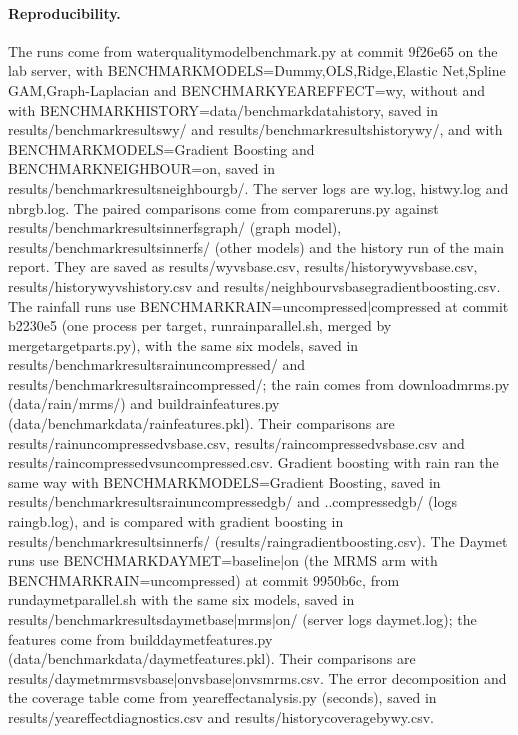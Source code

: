 \documentclass[11pt]{article}
\newcommand{\codeus}{\textunderscore\allowbreak}
\newcommand{\code}[1]{{\ttfamily\let\_\codeus #1}}
\begin{document}
\paragraph{Reproducibility.} The runs come from \code{water\_quality\_model\_benchmark.py} at commit
\code{9f26e65} on the lab server, with
\code{BENCHMARK\_MODELS=Dummy,OLS,Ridge,Elastic Net,Spline GAM,Graph-Laplacian} and
\code{BENCHMARK\_YEAR\_EFFECT=wy}, without and with \code{BENCHMARK\_HISTORY=data/benchmark\_data\_history},
saved in \code{results/benchmark\_results\_wy/} and \code{results/benchmark\_results\_history\_wy/}, and
with \code{BENCHMARK\_MODELS=Gradient Boosting} and \code{BENCHMARK\_NEIGHBOUR=on}, saved in
\code{results/benchmark\_results\_neighbour\_gb/}. The server logs are \code{wy.log},
\code{hist\_wy.log} and \code{nbr\_gb.log}. The paired comparisons come from \code{compare\_runs.py} against
\code{results/benchmark\_results\_inner\_fs\_graph/} (graph model),
\code{results/benchmark\_results\_inner\_fs/} (other models) and the history run of the main report.
They are saved as \code{results/wy\_vs\_base\_*.csv}, \code{results/history\_wy\_vs\_base\_*.csv},
\code{results/history\_wy\_vs\_history\_*.csv} and
\code{results/neighbour\_vs\_base\_gradient\_boosting.csv}.
The rainfall runs use \code{BENCHMARK\_RAIN=uncompressed|compressed} at commit \code{b2230e5}
(one process per target, \code{run\_rain\_parallel.sh}, merged by \code{merge\_target\_parts.py}),
with the same six models, saved in \code{results/benchmark\_results\_rain\_uncompressed/} and
\code{results/benchmark\_results\_rain\_compressed/}; the rain comes from \code{download\_mrms.py}
(\code{data/rain/mrms/}) and \code{build\_rain\_features.py}
(\code{data/benchmark\_data/rain\_features\_*.pkl}). Their comparisons are
\code{results/rain\_uncompressed\_vs\_base\_*.csv}, \code{results/rain\_compressed\_vs\_base\_*.csv} and
\code{results/rain\_compressed\_vs\_uncompressed\_*.csv}. Gradient boosting with rain ran the same
way with \code{BENCHMARK\_MODELS=Gradient Boosting}, saved in
\code{results/benchmark\_results\_rain\_uncompressed\_gb/} and \code{..\_compressed\_gb/} (logs
\code{rain\_*\_gb.log}), and is compared with gradient boosting in
\code{results/benchmark\_results\_inner\_fs/} (\code{results/rain\_*\_gradient\_boosting.csv}).
The Daymet runs use \code{BENCHMARK\_DAYMET=baseline|on} (the MRMS arm with
\code{BENCHMARK\_RAIN=uncompressed}) at commit \code{9950b6c}, from \code{run\_daymet\_parallel.sh}
with the same six models, saved in \code{results/benchmark\_results\_daymet\_base|mrms|on/}
(server logs \code{daymet\_*.log}); the features come from \code{build\_daymet\_features.py}
(\code{data/benchmark\_data/daymet\_features.pkl}). Their comparisons are
\code{results/daymet\_mrms\_vs\_base|on\_vs\_base|on\_vs\_mrms\_*.csv}.
The error decomposition and the coverage table come from \code{year\_effect\_analysis.py} (seconds),
saved in \code{results/year\_effect\_diagnostics.csv} and \code{results/history\_coverage\_by\_wy.csv}.
\end{document}
